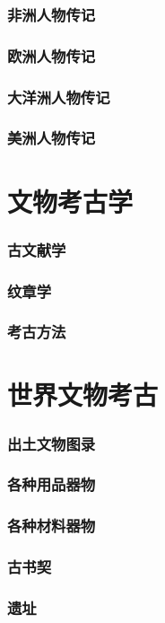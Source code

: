 \documentclass[UTF8]{../RepresentationUniverse}
\begin{document}
        \subsubsection{非洲人物传记}
        \subsubsection{欧洲人物传记}
        \subsubsection{大洋洲人物传记}
        \subsubsection{美洲人物传记}


\section{文物考古学}
    \subsubsection{古文献学}
    \subsubsection{纹章学}
    \subsubsection{考古方法}

\section{世界文物考古}
    \subsubsection{出土文物图录}
    \subsubsection{各种用品器物}
    \subsubsection{各种材料器物}
    \subsubsection{古书契}
    \subsubsection{遗址}
\end{document}

